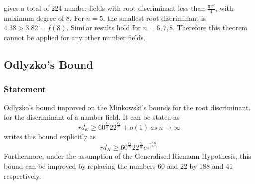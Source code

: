 \documentclass[12pt]{extarticle}
\newcommand{\<}{\langle}
\renewcommand{\>}{\rangle}
\theoremstyle{definition}
\begin{document}
\cite{JONE2} gives a total of 224 number fields with root discriminant less than $ \frac{\pi e^2}{4}$, with maximum degree of $8$.  For $n=5$, the smallest root discriminant is $4.38 > 3.82 = f(8)$. Similar results hold for $n = 6,7,8$. Therefore this theorem cannot be applied for any other number fields. 
\subsection{Odlyzko's Bound}
\subsubsection*{Statement}
Odlyzko's bound \cite{ODL1990} improved on the Minkowski's bounds for the root discriminant. for the discriminant of a number field. It can be stated as  
\begin{equation}
rd_K\geqslant 60^{\frac{r_1}{n}}22^{\frac{r_2}{n}}+o(1)\:as\:n\rightarrow \infty   
\end{equation}
\cite{MORENO} writes this bound explicitly as 
\begin{equation}
rd_K\geqslant 60^{\frac{r_1}{n}}22^{\frac{r_2}{n}}e^\frac{-8.6}{n^(2/3)}
\end{equation}
Furthermore, under the assumption of the Generalised Riemann Hypothesis, 
this bound can be improved by replacing the numbers 60 and 22 by 188 and 41 respectively. 
\end{document}
